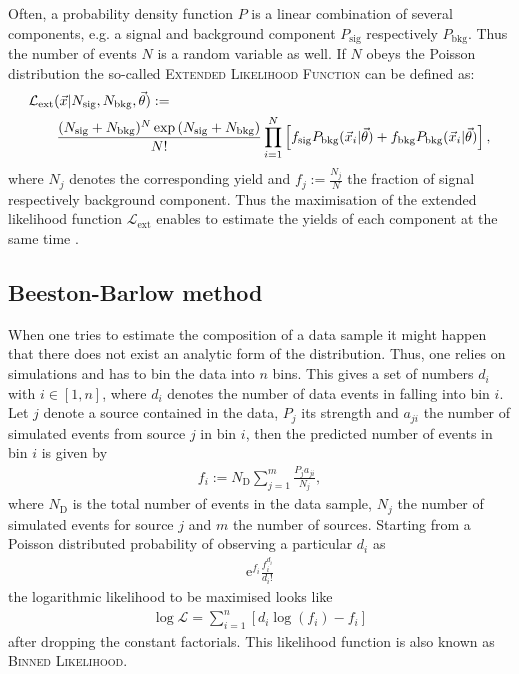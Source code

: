 Often, a probability density function $P$ is a linear combination of several components, e.g. a signal and background component $P_\text{sig}$ respectively $P_\text{bkg}$.
Thus the number of events $N$ is a random variable as well.
If $N$ obeys the Poisson distribution the so-called \textsc{Extended Likelihood Function} can be defined as: 
\begin{align}
    &\mathcal{L}_\text{ext}(\vec{x} | \Nsig, \Nbkg, \vec{\theta}) :=  \nonumber \\ 
    &\qquad \frac{(\Nsig+\Nbkg)^N\exp{(\Nsig+\Nbkg)}}{N!} \prod_{i=1}^{N} \left[f_\text{sig}P_\text{bkg}(\vec{x}_i|\vec{\theta}) + f_\text{bkg}P_\text{bkg}(\vec{x}_i|\vec{\theta})\right],
\end{align} 
where $N_j$ denotes the corresponding yield and $f_j:=\frac{N_j}{N}$ the fraction of signal respectively background component.
Thus the maximisation of the extended likelihood function $\mathcal{L}_\text{ext}$ enables to estimate the yields of each component at the same time \cite{Lista_Statistics, PDG}.

\subsection{Beeston-Barlow method}
\label{sec:BeestonBarlow}
When one tries to estimate the composition of a data sample it might happen that there does not exist an analytic form of the distribution.
Thus, one relies on simulations and has to bin the data into $n$ bins.
This gives a set of numbers ${d_i}$ with $i \in [1,n]$, where $d_i$ denotes the number of data events in falling into bin $i$.
Let $j$ denote a source contained in the data, $P_j$ its strength and $a_{ji}$ the number of simulated events from source $j$ in bin $i$, then the predicted number of events in bin $i$ is given by
\begin{align}
    f_i := N_\text{D} \sum_{j=1}^{m} \frac{P_j a_{ji}}{N_j},
\end{align}
where $N_\text{D}$ is the total number of events in the data sample, $N_j$ the number of simulated events for source $j$ and $m$ the number of sources.
Starting from a Poisson distributed probability of observing a particular $d_i$ as
\begin{align}
    \mathrm{e}^{f_i} \frac{f_i^{d_i}}{d_i!}
\end{align}
the logarithmic likelihood to be maximised looks like
\begin{align}
    \log \mathcal{L} = \sum_{i=1}^{n} \left[d_i \log(f_i) - f_i\right] \label{eq:BinnedLL}
\end{align}
after dropping the constant factorials.
This likelihood function is also known as \textsc{Binned Likelihood}.

